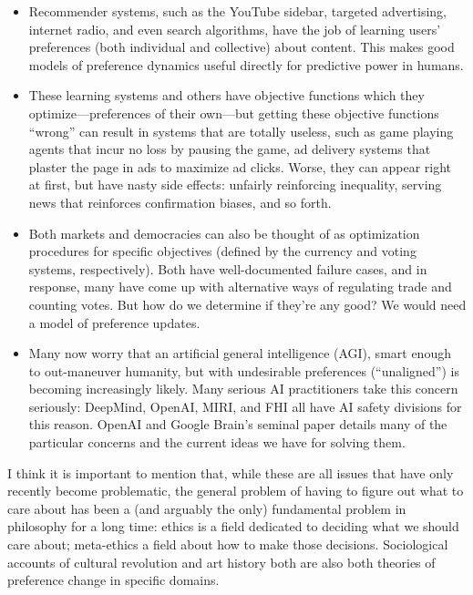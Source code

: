 \documentclass{article}
\begin{document}
	\begin{itemize}[]
		\item Recommender systems, such as the YouTube sidebar, targeted advertising, internet radio, and even search algorithms, have the job of learning users' preferences (both individual and collective) about content. This makes good models of preference dynamics useful directly for predictive power in humans.
		
		\item These learning systems and others have objective functions which they optimize---preferences of their own---but getting these objective functions ``wrong'' can result in systems that are totally useless, such as game playing agents that incur no loss by pausing the game, ad delivery systems that plaster the page in ads to maximize ad clicks. Worse, they can appear right at first, but have nasty side effects: unfairly reinforcing inequality, serving news that reinforces confirmation biases, and so forth.
		
		\item Both markets and democracies can also be thought of as optimization procedures for specific objectives (defined by the currency and voting systems, respectively). Both have well-documented failure cases, and in response, many have come up with alternative ways of regulating trade and counting votes. But how do we determine if they're any good? We would need a model of preference updates.
		
		\item  Many now worry that an artificial general intelligence (AGI), smart enough to out-maneuver humanity, but with undesirable preferences (``unaligned'') is becoming increasingly likely. Many serious AI practitioners take this concern seriously: DeepMind, OpenAI, MIRI, and FHI all have AI safety divisions for this reason. OpenAI and Google Brain's seminal paper \cite{amodei2016concrete} details many of the particular concerns and the current ideas we have for solving them.
		
	\end{itemize}

	I think it is important to mention that, while these are all issues that have only recently become problematic, the general problem of having to figure out what to care about has been a (and arguably the only) fundamental problem in philosophy for a long time: ethics is a field dedicated to deciding what we should care about; meta-ethics a field about how to make those decisions. Sociological accounts of cultural revolution and art history both are also both theories of preference change in specific domains.
	
\end{document}
